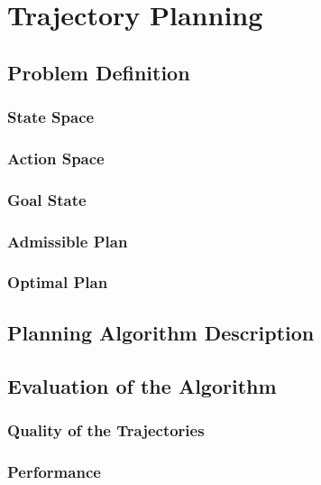 \chapter{Trajectory Planning}

\section{Problem Definition}

\subsection{State Space}

\subsection{Action Space}

\subsection{Goal State}

\subsection{Admissible Plan}

\subsection{Optimal Plan}

\section{Planning Algorithm Description}

\section{Evaluation of the Algorithm}

\subsection{Quality of the Trajectories}

\subsection{Performance}